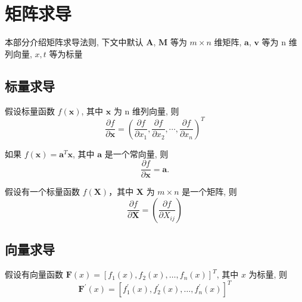 \section{矩阵求导}
本部分介绍矩阵求导法则, 
下文中默认 $ \textbf{A} $, $ \textbf{M} $ 等为 $ m \times n $ 维矩阵, $\mathbf{a}$, $ \mathbf{v} $ 等为 n 维列向量, $ x, t $ 等为标量
\subsection{标量求导}
\begin{definition}
    假设标量函数 $ f(\mathbf{x}) $, 其中 $ \mathbf{x} $ 为 n 维列向量, 则 
\begin{equation}
    \frac{\partial f}{\partial \mathbf{x}} = \left( \frac{\partial f}{\partial x_1}, \frac{\partial f}{\partial x_2}, \cdots, \frac{\partial f}{\partial x_n} \right)^{T}
\end{equation}
\end{definition}
\begin{proposition}
        如果 $f(\mathbf{x}) = \mathbf{a}^T \mathbf{x}$, 其中 $\mathbf{a}$ 是一个常向量, 则
        \begin{equation}
            \frac{\partial f}{\partial \mathbf{x}} = \mathbf{a}.
        \end{equation}
\end{proposition}

\begin{definition}
    假设有一个标量函数 $ f(\mathbf{X}) $，其中 $\mathbf{X} $ 为 $ m \times n $ 是一个矩阵, 则
\begin{equation}
    \frac{\partial f}{\partial \mathbf{X}} = \left( \frac{\partial f}{\partial X_{ij}} \right)
\end{equation}
\end{definition}

\subsection{向量求导}

\begin{definition}
    假设有向量函数 $ \mathbf{F}(x) = [f_{1}(x), f_{2}(x), \dots, f_{n}(x)]^{T} $, 其中 $ x $ 为标量, 则
\begin{equation}
    \mathbf{F}^{'}(x) = [f_{1}^{'}(x), f_{2}^{'}(x), \dots, f_{n}^{'}(x)]^{T}
\end{equation}
\end{definition}

